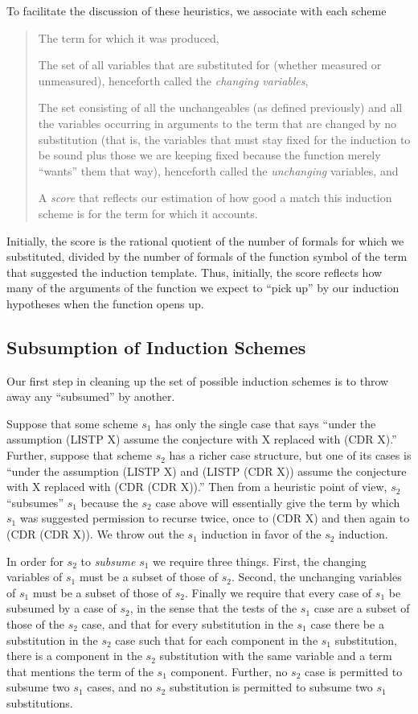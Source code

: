 \documentclass[11pt]{book}
\newenvironment{pubcrown}{\begin{quote}}{\end{quote}}
\newcommand{\pubinlineunderline}[1]{\emph{#1}}
\newcommand{\pubdefaulttextsize}{\large}
\begin{document}
To facilitate the discussion of these heuristics,
we associate with each scheme
\begin{pubcrown}
The term for which it was produced,

The set of all variables
that are substituted for (whether measured or unmeasured), henceforth
called the \pubinlineunderline{changing variables},

The set consisting of all the  unchangeables (as defined previously)
and all the variables occurring in arguments to the term that
are changed by no substitution (that is,
the variables that must stay
fixed for the induction to be sound  plus those we are keeping fixed
because the function merely ``wants'' them that way), henceforth
called the \pubinlineunderline{unchanging} variables, and

A \pubinlineunderline{score} that reflects our estimation of how good a match this induction scheme
is for the term for which it accounts.
\end{pubcrown}
Initially, the score
is the rational quotient of the number of formals for which we substituted,
divided by the number of formals of the function symbol of
the term that suggested the induction template.  Thus, initially, the score
reflects how many of the arguments of the function we expect to ``pick up'' by our
induction hypotheses when the function opens up.
\subsection{Subsumption of Induction Schemes}
\pubdefaulttextsize
Our  first step in cleaning up the set of possible
induction schemes is to throw away any ``subsumed'' by another.

Suppose that some
scheme $s_{1}$ has only the single case that says ``under the
assumption (LISTP X) assume the conjecture with X replaced with (CDR X).''
Further, suppose that scheme $s_{2}$ has a richer case structure, but one of
its cases is ``under the assumption (LISTP X) and (LISTP (CDR X))
assume the conjecture with X replaced with (CDR (CDR X)).''  Then from a
heuristic point of view, $s_{2}$ ``subsumes'' $s_{1}$ because the $s_{2}$ case above
will essentially give the term by which $s_{1}$ was suggested permission
to recurse twice, once to (CDR X) and then again to (CDR (CDR X)).
We throw out the $s_{1}$ induction in favor of the $s_{2}$
induction.

In order for $s_{2}$ to \pubinlineunderline{subsume} $s_{1}$ we require three things.  First, the
changing variables of $s_{1}$ must be a subset of those of $s_{2}$.
Second, the unchanging variables of $s_{1}$ must be a subset of those of $s_{2}$.
Finally we require that every case of $s_{1}$ be subsumed by a case of $s_{2}$,
in the sense that the tests of the $s_{1}$ case are a subset of those of the $s_{2}$ case,
and that for every substitution in the $s_{1}$ case there be a substitution in
the $s_{2}$ case such that for each component in the $s_{1}$ substitution, there
is a component in the $s_{2}$ substitution with the same variable and a term
that mentions the term of the $s_{1}$ component.  Further, no $s_{2}$ case
is permitted to subsume two $s_{1}$ cases, and no $s_{2}$ substitution is
permitted to subsume two $s_{1}$ substitutions.
\end{document}
